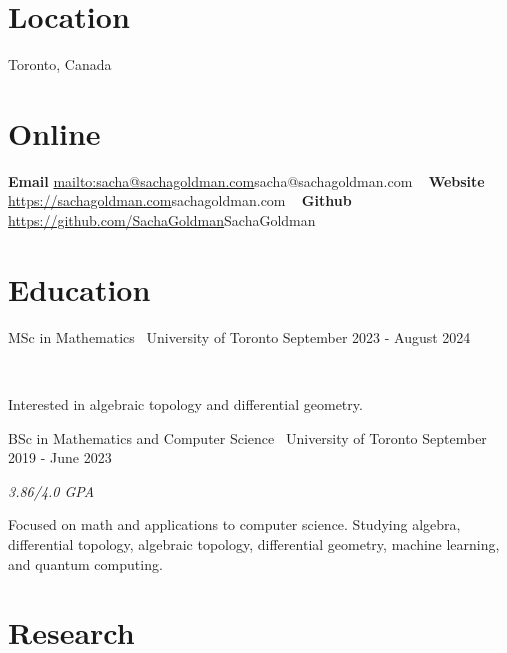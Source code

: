 \documentclass[]{style}
\begin{document}

\begin{aside}
\section{Location}
Toronto, Canada
\section{Online}
\textbf{Email}
\url{mailto:sacha@sachagoldman.com}{sacha@sachagoldman.com} 
~ \vspace{-2mm}
\textbf{Website} 
\url{https://sachagoldman.com}{sachagoldman.com} 
~ \vspace{-2mm}
\textbf{Github}
\url{https://github.com/SachaGoldman}{SachaGoldman}
\end{aside}

\section{Education}

\begin{entrylist}

\vspace{1mm}

\entry
{MSc in Mathematics \ {\normalfont University of Toronto}}
{September 2023 - August 2024}
{  ~ \vspace{-2.5mm}

Interested in algebraic topology and differential geometry. 
}

\entry
{BSc in Mathematics and Computer Science \ {\normalfont University of Toronto}}
{September 2019 - June 2023}
{\emph{3.86/4.0 GPA}
~ \vspace{1mm}

Focused on math and applications to computer science. Studying algebra, differential topology, algebraic topology, differential geometry, machine learning, and quantum computing.
}

\end{entrylist}

\section{Research}
\end{document}
